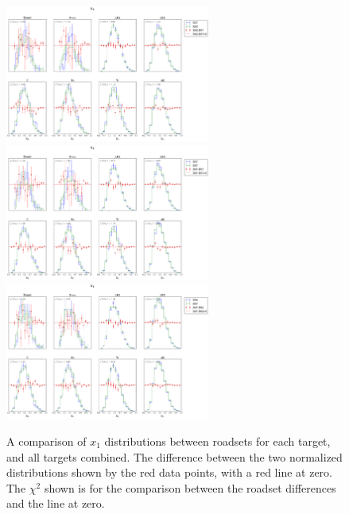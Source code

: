 \begin{figure}
	\centering
	\includegraphics[width=0.6\textwidth]{figures/analysis/R57_R62_compare_xB.png}\vspace{5pt} \\
	\includegraphics[width=0.6\textwidth]{figures/analysis/R57_R67_compare_xB.png} \vspace{5pt} \\
	\includegraphics[width=0.6\textwidth]{figures/analysis/R62_R67_compare_xB.png}
	\caption{A comparison of $x_1$ distributions between roadsets for each target, and all targets combined. The difference between the two normalized distributions shown by the red data points, with a red line at zero. The $\chi^2$ shown is for the comparison between the roadset differences and the line at zero.}
	\label{fig:roadset-x1-compare}
\end{figure}

